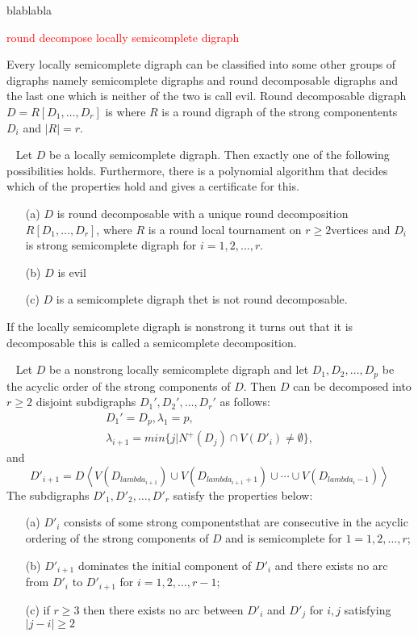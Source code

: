 blablabla
\begin{thm}
    \textcolor{red}{round decompose locally semicomplete digraph}
\end{thm}
Every locally semicomplete digraph can be classified into some other groups of digraphs namely semicomplete digraphs and round decomposable digraphs and the last one which is neither of the two is call evil. Round decomposable digraph $D=R[D_1,\dots,D_r]$ is where $R$ is a round digraph of the strong componentents $D_i$ and $|R|=r$.
\begin{thm}~\cite{bangJGT85}
    Let $D$ be a locally semicomplete digraph. Then exactly one of the following possibilities holds. Furthermore, there is a polynomial algorithm that decides which of the properties hold and gives a certificate for this.
    \begin{itemize}
        \item[(a)] $D$ is round decomposable with a unique round decomposition $R[D_1,\dots ,D_r]$, where $R$ is a round local tournament on $r\geq 2$vertices and $D_i$ is strong semicomplete digraph for $i=1,2,\dots,r$.
        \item[(b)] $D$ is evil 
        \item[(c)] $D$ is a semicomplete digraph thet is not round decomposable. 
    \end{itemize}
\end{thm}
If the locally semicomplete digraph is nonstrong it turns out that it is decomposable this is called a semicomplete decomposition.
\begin{thm}~\cite{bangJGT85,banggutin,bangJCT102}
    Let $D$ be a nonstrong locally semicomplete digraph and let $D_1,D_2,\dots,D_p$ be the acyclic order of the strong components of $D$. Then $D$ can be decomposed into $r\geq 2$ disjoint subdigraphs $D_1',D_2',\dots, D_r'$ as follows:
    \begin{align*}
        D_1'=D_p, \lambda_1=p,\\
        \lambda_{i+1}=min\lbrace j|N^+(D_j)\cap V(D'_i)\neq \emptyset\rbrace,
    \end{align*}
    and
    \begin{equation*}
        D'_{i+1}=D\left<V(D_{lambda_{i+1}})\cup V(D_{lambda_{i+1}+1})\cup \cdots \cup V(D_{lambda_{i}-1})\right>
    \end{equation*}
    The subdigraphs $D'_1,D'_2,\dots,D'_r$ satisfy the properties below:
    \begin{itemize}
        \item[(a)] $D'_i$ consists of some strong componentsthat are consecutive in the acyclic ordering of the strong components of $D$ and is semicomplete for $1=1,2,\dots,r$;
        \item[(b)] $D'_{i+1}$ dominates the initial component of $D'_i$ and there exists no arc from $D'_i$ to $D'_{i+1}$ for $i=1,2,\dots,r-1$;
        \item[(c)] if $r\geq 3$ then there exists no arc between $D'_i$ and $D'_j$ for $i,j$ satisfying $|j-i|\geq 2$  
    \end{itemize}
    \label{thm:semicompletedecom}
\end{thm}
